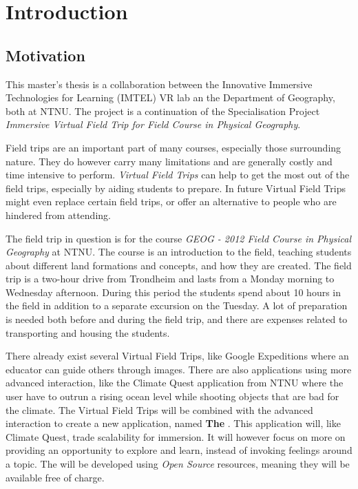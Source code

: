 \chapter{Introduction}
\section{Motivation}
    \label{sec:motivation}
    This master's thesis is a collaboration between the Innovative Immersive Technologies for Learning (IMTEL) VR lab an the Department of Geography, both at NTNU. The project is a continuation of the Specialisation Project \emph{Immersive Virtual Field Trip for Field Course in Physical Geography}\cite{specialisation}.
    
    Field trips are an important part of many courses, especially those surrounding nature. They do however carry many limitations and are generally costly and time intensive to perform. \emph{Virtual Field Trips} can help to get the most out of the field trips, especially by aiding students to prepare. In future Virtual Field Trips might even replace certain field trips, or offer an alternative to people who are hindered from attending.
    
    The field trip in question is for the course \emph{GEOG - 2012 Field Course in Physical Geography} at NTNU. The course is an introduction to the field, teaching students about different land formations and concepts, and how they are created\cite{geog2012}. The field trip is a two-hour drive from Trondheim and lasts from a Monday morning to Wednesday afternoon. During this period the students spend about 10 hours in the field in addition to a separate excursion on the Tuesday. A lot of preparation is needed both before and during the field trip, and there are expenses related to transporting and housing the students.
    
    There already exist several Virtual Field Trips, like Google Expeditions\cite{google_expeditions} where an educator can guide others through images. There are also applications using more advanced interaction, like the Climate Quest\cite{bachelor} application from NTNU where the user have to outrun a rising ocean level while shooting objects that are bad for the climate.
    The  Virtual Field Trips will be combined with the advanced interaction to create a new application, named \textbf{The \ApplicationName}. This application will, like Climate Quest, trade scalability for immersion. It will however focus on more on providing an opportunity to explore and learn, instead of invoking feelings around a topic. The \ApplicationName \hspace{0.1cm} will be developed using \emph{Open Source} resources, meaning they will be available free of charge.
    
